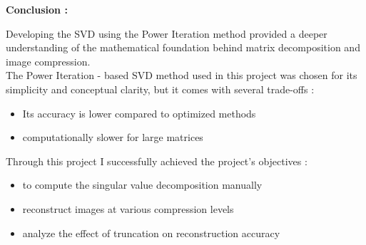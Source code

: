 \documentclass[journal]{IEEEtran}
\begin{document}
\begin{table}[h!]    
      \centering
      
      \caption{Greyscale}
      \label{}
    \end{table}


\begin{table}[h!]    
      \centering
      
      \caption{Globe}
      \label{}
    \end{table}


\newpage

\textbf{Conclusion :}


Developing the SVD using the Power Iteration method provided a deeper understanding of the mathematical foundation behind matrix decomposition and image compression. \\

The Power Iteration - based SVD method used in this project was chosen for its simplicity and conceptual clarity, but it comes with several trade-offs :
\begin{itemize}
    \item Its accuracy is lower compared to optimized methods
    \item computationally slower for large matrices
\end{itemize}
\vspace{2em}
Through this project I successfully achieved the project's objectives :
\begin{itemize}
    \item to compute the singular value decomposition manually
    \item reconstruct images at various compression levels
    \item analyze the effect of truncation on reconstruction accuracy
\end{itemize}
\end{document}
